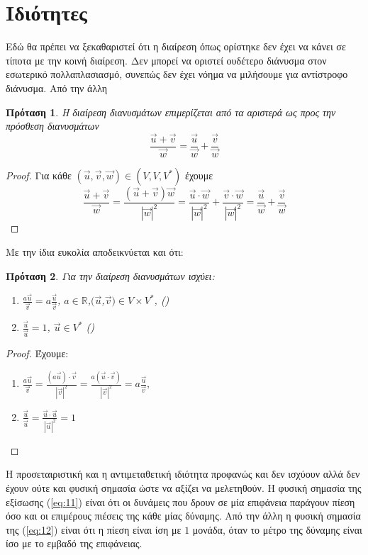 \documentclass[12pt,titlepage]{article}
\newtheorem{proposition}{Πρόταση}
\begin{document}
\section{Ιδιότητες}
Εδώ θα πρέπει να ξεκαθαριστεί ότι η διαίρεση όπως ορίστηκε δεν έχει να κάνει σε τίποτα με την κοινή διαίρεση. Δεν μπορεί να οριστεί ουδέτερο διάνυσμα στον εσωτερικό πολλαπλασιασμό, συνεπώς δεν έχει νόημα να μιλήσουμε για αντίστροφο διάνυσμα. Από την άλλη
\begin{proposition}
 Η διαίρεση διανυσμάτων επιμερίζεται από τα αριστερά ως προς την πρόσθεση διανυσμάτων
 \begin{equation} \label{eq:10}
  \frac{\vec{u}+\vec{v}}{\vec{w}}=\frac{\vec{u}}{\vec{w}}+\frac{\vec{v}}{\vec{w}}
 \end{equation}
\end{proposition}
\begin{proof}
 Για κάθε $(\vec{u},\vec{v},\vec{w})\in (V,V,V^*)$ έχουμε
 \begin{equation*} \label{eq:9}
  \frac{\vec{u}+\vec{v}}{\vec{w}}=\frac{(\vec{u}+\vec{v})\vec{w}}{|\vec{w}|^2}=\frac{\vec{u}\cdot\vec{w}}{|\vec{w}|^2}+\frac{\vec{v}\cdot\vec{w}}{\left|\vec{w}\right|^2} = \frac{\vec{u}}{\vec{w}}+\frac{\vec{v}}{\vec{w}}
 \end{equation*}
\end{proof}
Με την ίδια ευκολία αποδεικνύεται και ότι:
\begin{proposition}
 Για την διαίρεση διανυσμάτων ισχύει:
 \begin{enumerate}
   \label{eq:11}
  \item $\displaystyle \frac{a\vec{u}}{\vec{v}}=a\frac{\vec{u}}{\vec{v}}$, $a\in\mathbb{R}$,$(\vec{u}$,$\vec{v})\in V\times V^*$, \hfill \textnormal{()}   \label{eq:12}
  \item $\displaystyle \frac{\vec{u}}{\vec{u}}=1$, $\vec{u}\in V^*$ \hfill \textnormal{()}
 \end{enumerate}
\end{proposition}
\begin{proof}
 Έχουμε:
 \begin{enumerate}
  \item $\displaystyle \frac{a\vec{u}}{\vec{v}}=\frac{(a\vec{u})\cdot\vec{v}}{|\vec{v}|^2}=\frac{a(\vec{u}\cdot\vec{v})}{|\vec{v}|^2}=a\frac{\vec{u}}{\vec{v}}$,
  \item $\displaystyle \frac{\vec{u}}{\vec{u}}=\frac{\vec{u}\cdot\vec{u}}{|\vec{u}|^2}=1$
 \end{enumerate}
\end{proof}
Η προσεταιριστική και η αντιμεταθετική ιδιότητα προφανώς και δεν ισχύουν αλλά δεν έχουν ούτε και φυσική σημασία ώστε να αξίζει να μελετηθούν. Η φυσική σημασία της εξίσωσης (\ref{eq:11}) είναι ότι οι δυνάμεις που δρουν σε μία επιφάνεια παράγουν πίεση όσο και οι επιμέρους πιέσεις της κάθε μίας δύναμης. Από την άλλη η φυσική σημασία της (\ref{eq:12}) είναι ότι η πίεση είναι ίση με $1$ μονάδα, όταν το μέτρο της δύναμης είναι ίσο με το εμβαδό της επιφάνειας.
\end{document}

